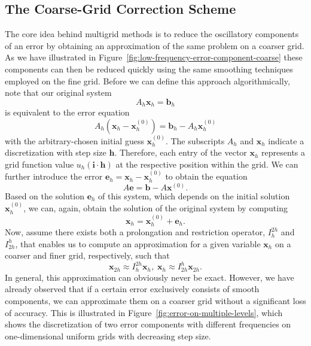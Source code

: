 \subsection{The Coarse-Grid Correction Scheme}
The core idea behind multigrid methods is to reduce the oscillatory components of an error by obtaining an approximation of the same problem on a coarser grid.
As we have illustrated in Figure~\ref{fig:low-frequency-error-component-coarse} these components can then be reduced quickly using the same smoothing techniques employed on the fine grid.
Before we can define this approach algorithmically, note that our original system
\begin{equation}
	A_h \bm{x}_h = \bm{b}_h
\end{equation}
is equivalent to the error equation
\begin{equation}
	A_h \left(\bm{x}_h - \bm {x}^{(0)}_h\right) = \bm{b}_h - A_h \bm{x}^{(0)}_h
\end{equation}
with the arbitrary-chosen initial guess $\bm{x}^{(0)}_h$.
The subscripts $A_h$ and $\bm{x}_h$ indicate a discretization with step size $\bm{h}$.
Therefore, each entry of the vector $\bm{x}_h$ represents a grid function value $u_h(\bm{i} \cdot \bm{h})$ at the respective position within the grid.
We can further introduce the error $\bm{e}_h = \bm{x}_h - \bm {x}^{(0)}_h$ to obtain the equation
\begin{equation}
	A \bm{e} = \bm{b} - A \bm{x}^{(0)}.
	\label{eq:linear-system-error-equation}
\end{equation}
Based on the solution $\bm{e}_h$ of this system, which depends on the initial solution $\bm{x}^{(0)}_h$, we can, again, obtain the solution of the original system by computing
\begin{equation}
	\bm{x}_h = \bm{x}^{(0)}_h + \bm{e}_h.
\end{equation}
Now, assume there exists both a prolongation and restriction operator, $I_h^{2h}$ and $I_{2h}^h$, that enables us to compute an approximation for a given variable $\bm{x}_h$ on a coarser and finer grid, respectively, such that
\begin{equation}
	\bm{x}_{2h} \approx I_h^{2h} \bm{x}_{h}, \;
	\bm{x}_{h} \approx I_{2h}^{h} \bm{x}_{2h}. 
\end{equation}
In general, this approximation can obviously never be exact.
However, we have already observed that if a certain error exclusively consists of smooth components, we can approximate them on a coarser grid without a significant loss of accuracy.
This is illustrated in Figure~\ref{fig:error-on-multiple-levels}, which shows the discretization of two error components with different frequencies on one-dimensional uniform grids with decreasing step size.
